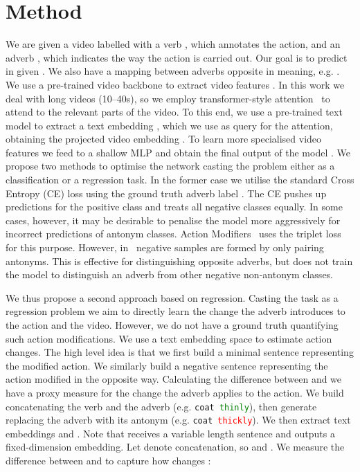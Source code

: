 \documentclass[10pt,twocolumn,letterpaper]{article}
\begin{document}
\vspace{-3pt}
\section{Method}
\label{sec:method}
\vspace{-2pt}

We are given a video  labelled with a verb , which annotates the action, and an adverb , which indicates the way the action is carried out. Our goal is to predict  in  given . We also have 
a mapping  between adverbs opposite in meaning, e.g. .  We use a pre-trained video backbone  to extract video features . In this work we deal with long videos (10--40s), so we employ transformer-style attention~\cite{vaswani2017attention} to attend to the relevant parts of the video. To this end, we use a pre-trained text model  to extract a text embedding , which we use as query for the attention, obtaining the projected video embedding . To learn more specialised video features we feed  to a shallow MLP and 
obtain the final output of the model .
We propose two methods to optimise the network casting the problem either as a classification or a regression task. In the former case we utilise the standard Cross Entropy (CE) loss using the ground truth adverb label . 
The CE 
pushes up predictions for the 
positive class and treats all negative classes equally. In some cases, however, it may be desirable 
to penalise the model more aggressively for incorrect predictions of antonym classes. 
Action Modifiers~\cite{doughty2020action} uses the triplet loss for this purpose. However, in~\cite{doughty2020action} negative samples are formed by only pairing antonyms. This is effective for distinguishing opposite adverbs, but does not train the model to distinguish an adverb from other negative non-antonym classes.

\vspace{15pt}

We thus propose a second approach based on regression. 
Casting the task as a regression problem we aim to directly learn the change the adverb introduces to the action and the video. However, 
we do not have a ground truth quantifying such action modifications. 
We use a text embedding space to estimate action 
changes. The high level idea is that we first build a minimal sentence  representing the modified action. We similarly build a negative sentence  representing the action modified in the opposite way.
Calculating the difference between  and  we have a proxy measure for the change the adverb applies to the action. We build  concatenating the verb and the adverb (e.g. \texttt{coat \textcolor{Green}{thinly}}), then generate  replacing the 
adverb with its antonym (e.g. \texttt{coat \textcolor{red}{thickly}}). 
We then extract text embeddings  and . 
Note that  receives a variable length sentence and outputs a fixed-dimension embedding. 
Let  denote concatenation, so  and . We 
measure the difference between  and  to capture how  changes :
\end{document}
